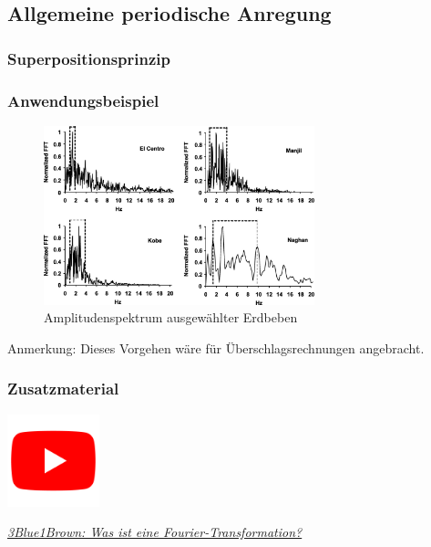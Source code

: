 

\subsection{Allgemeine periodische Anregung}

\begin{frame}
\frametitle{Superpositionsprinzip}
\begin{center}

\end{center}
\end{frame}


\begin{frame}
\frametitle{Anwendungsbeispiel}
\begin{figure}
 \includegraphics[width=0.7\textwidth]{fig_img/earthquake_spectra.jpg}
 \caption*{Amplitudenspektrum ausgewählter Erdbeben \cite{amiri2008}}
\end{figure}
Anmerkung: Dieses Vorgehen wäre für Überschlagsrechnungen angebracht.

\end{frame}



\begin{frame}
\frametitle{Zusatzmaterial} %
\vfill
\begin{center}
\includegraphics[width=0.2\textwidth]{fig_img/youtube.png}  

\href{https://www.youtube.com/watch?v=spUNpyF58BY}{\textsl{3Blue1Brown: Was ist eine Fourier-Transformation?}}
\end{center}  
\vfill
\end{frame}

